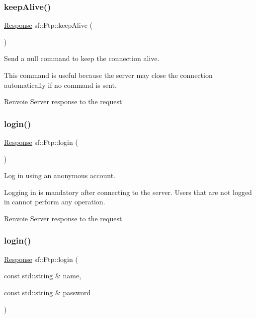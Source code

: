 \subsubsection{\texorpdfstring{keep\+Alive()}{keepAlive()}}
{\footnotesize\ttfamily \hyperlink{classsf_1_1Ftp_1_1Response}{Response} sf\+::\+Ftp\+::keep\+Alive (\begin{DoxyParamCaption}{ }\end{DoxyParamCaption})}



Send a null command to keep the connection alive. 

This command is useful because the server may close the connection automatically if no command is sent.

\begin{DoxyReturn}{Renvoie}
Server response to the request 
\end{DoxyReturn}
\mbox{\label{classsf_1_1Ftp_a686262bc377584cd50e52e1576aa3a9b}} 
\subsubsection{\texorpdfstring{login()}{login()}\hspace{0.1cm}{\footnotesize\ttfamily [1/2]}}
{\footnotesize\ttfamily \hyperlink{classsf_1_1Ftp_1_1Response}{Response} sf\+::\+Ftp\+::login (\begin{DoxyParamCaption}{ }\end{DoxyParamCaption})}



Log in using an anonymous account. 

Logging in is mandatory after connecting to the server. Users that are not logged in cannot perform any operation.

\begin{DoxyReturn}{Renvoie}
Server response to the request 
\end{DoxyReturn}
\mbox{\label{classsf_1_1Ftp_a99d8114793c1659e9d51d45cecdcd965}} 
\subsubsection{\texorpdfstring{login()}{login()}\hspace{0.1cm}{\footnotesize\ttfamily [2/2]}}
{\footnotesize\ttfamily \hyperlink{classsf_1_1Ftp_1_1Response}{Response} sf\+::\+Ftp\+::login (\begin{DoxyParamCaption}\item[{const std\+::string \&}]{name,  }\item[{const std\+::string \&}]{password }\end{DoxyParamCaption})}




